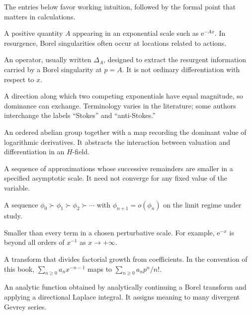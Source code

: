 \documentclass[11pt,openany]{book}
\theoremstyle{plain}
\theoremstyle{definition}
\theoremstyle{remark}
\newcommand{\e}{\mathrm{e}}
\begin{document}
The entries below favor working intuition, followed by the formal point that matters in calculations.

\begin{description}[style=nextline,itemsep=0.75em]
\item[Action]
A positive quantity $A$ appearing in an exponential scale such as $\e^{-Ax}$. In resurgence, Borel singularities often occur at locations related to actions.

\item[Alien derivative]
An operator, usually written $\Delta_A$, designed to extract the resurgent information carried by a Borel singularity at $p=A$. It is not ordinary differentiation with respect to $x$.

\item[Anti-Stokes direction]
A direction along which two competing exponentials have equal magnitude, so dominance can exchange. Terminology varies in the literature; some authors interchange the labels ``Stokes'' and ``anti-Stokes.''

\item[Asymptotic couple]
An ordered abelian group together with a map recording the dominant value of logarithmic derivatives. It abstracts the interaction between valuation and differentiation in an $H$-field.

\item[Asymptotic expansion]
A sequence of approximations whose successive remainders are smaller in a specified asymptotic scale. It need not converge for any fixed value of the variable.

\item[Asymptotic scale]
A sequence $\phi_0\succ\phi_1\succ\phi_2\succ\cdots$ with $\phi_{n+1}=o(\phi_n)$ on the limit regime under study.

\item[Beyond all orders]
Smaller than every term in a chosen perturbative scale. For example, $\e^{-x}$ is beyond all orders of $x^{-1}$ as $x\to+\infty$.

\item[Borel transform]
A transform that divides factorial growth from coefficients. In the convention of this book,
$\sum_{n\ge0}a_nx^{-n-1}$ maps to $\sum_{n\ge0}a_np^n/n!$.

\item[Borel sum]
An analytic function obtained by analytically continuing a Borel transform and applying a directional Laplace integral. It assigns meaning to many divergent Gevrey series.


\end{description}
\end{document}
